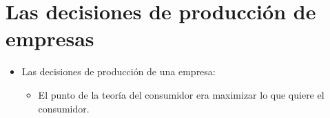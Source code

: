 \section{Las decisiones de producción de empresas}
\begin{itemize}
    \item Las decisiones de producción de una empresa:
    \begin{itemize}
        \item El punto de la teoría del consumidor era maximizar lo que quiere el consumidor.
    \end{itemize}

\end{itemize}
